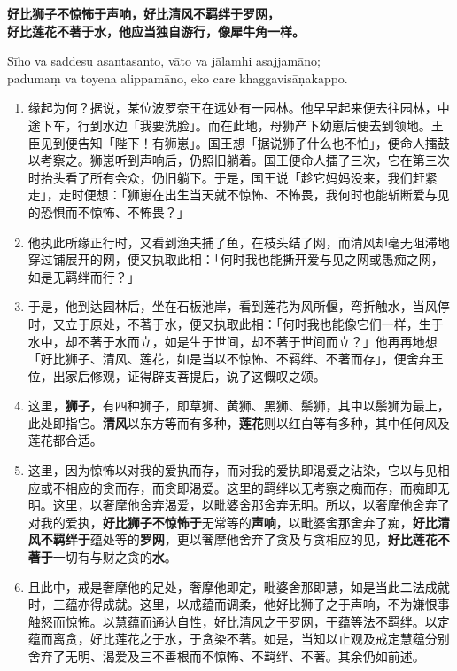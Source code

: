 \textbf{好比狮子不惊怖于声响，好比清风不羁绊于罗网，\\}
\textbf{好比莲花不著于水，他应当独自游行，像犀牛角一样。}

Sīho va saddesu asantasanto, vāto va jālamhi asajjamāno;\\
padumaṃ va toyena alippamāno, eko care khaggavisāṇakappo. %

\begin{enumerate}\item 缘起为何？据说，某位波罗奈王在远处有一园林。他早早起来便去往园林，中途下车，行到水边「我要洗脸」。而在此地，母狮产下幼崽后便去到领地。王臣见到便告知「陛下！有狮崽」。国王想「据说狮子什么也不怕」，便命人擂鼓以考察之。狮崽听到声响后，仍照旧躺着。国王便命人擂了三次，它在第三次时抬头看了所有会众，仍旧躺下。于是，国王说「趁它妈妈没来，我们赶紧走」，走时便想：「狮崽在出生当天就不惊怖、不怖畏，我何时也能斩断爱与见的恐惧而不惊怖、不怖畏？」
\item 他执此所缘正行时，又看到渔夫捕了鱼，在枝头结了网，而清风却毫无阻滞地穿过铺展开的网，便又执取此相：「何时我也能撕开爱与见之网或愚痴之网，如是无羁绊而行？」
\item 于是，他到达园林后，坐在石板池岸，看到莲花为风所偃，弯折触水，当风停时，又立于原处，不著于水，便又执取此相：「何时我也能像它们一样，生于水中，却不著于水而立，如是生于世间，却不著于世间而立？」他再再地想「好比狮子、清风、莲花，如是当以不惊怖、不羁绊、不著而存」，便舍弃王位，出家后修观，证得辟支菩提后，说了这慨叹之颂。
\item 这里，\textbf{狮子}，有四种狮子，即草狮、黄狮、黑狮、鬃狮，其中以鬃狮为最上，此处即指它。\textbf{清风}以东方等而有多种，\textbf{莲花}则以红白等有多种，其中任何风及莲花都合适。
\item 这里，因为惊怖以对我的爱执而存，而对我的爱执即渴爱之沾染，它以与见相应或不相应的贪而存，而贪即渴爱。这里的羁绊以无考察之痴而存，而痴即无明。这里，以奢摩他舍弃渴爱，以毗婆舍那舍弃无明。所以，以奢摩他舍弃了对我的爱执，\textbf{好比狮子不惊怖于}无常等的\textbf{声响}，以毗婆舍那舍弃了痴，\textbf{好比清风不羁绊于}蕴处等的\textbf{罗网}，更以奢摩他舍弃了贪及与贪相应的见，\textbf{好比莲花不著于}一切有与财之贪的\textbf{水}。
\item 且此中，戒是奢摩他的足处，奢摩他即定，毗婆舍那即慧，如是当此二法成就时，三蕴亦得成就。这里，以戒蕴而调柔，他好比狮子之于声响，不为嫌恨事触怒而惊怖。以慧蕴而通达自性，好比清风之于罗网，于蕴等法不羁绊。以定蕴而离贪，好比莲花之于水，于贪染不著。如是，当知以止观及戒定慧蕴分别舍弃了无明、渴爱及三不善根而不惊怖、不羁绊、不著。其余仍如前述。\end{enumerate}

